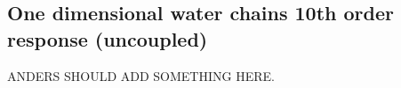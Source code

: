 \documentclass[prl,aps,twocolumn,showpacs,twocolumngrid,superbib]{revtex4}
\begin{document}
\subsection{One dimensional water chains 10th order response (uncoupled)}
ANDERS SHOULD ADD SOMETHING HERE.


\end{document}
